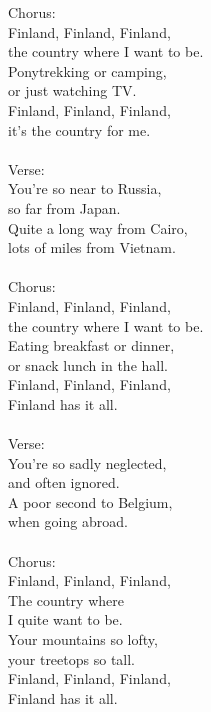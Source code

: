 
Chorus:  \\ Finland, Finland, Finland, \\ the country where I want to be. \\ Ponytrekking or camping, \\ or just watching TV. \\ Finland, Finland, Finland, \\ it's the country for me. \\ \hspace{10mm} \\ Verse:  \\ You're so near to Russia, \\ so far from Japan. \\ Quite a long way from Cairo, \\ lots of miles from Vietnam. \\ \hspace{10mm} \\ Chorus:  \\ Finland, Finland, Finland, \\ the country where I want to be. \\ Eating breakfast or dinner, \\ or snack lunch in the hall. \\ Finland, Finland, Finland, \\ Finland has it all. \\ \hspace{10mm} \\ Verse:  \\ You're so sadly neglected, \\ and often ignored. \\ A poor second to Belgium, \\ when going abroad. \\ \hspace{10mm} \\ Chorus:  \\ Finland, Finland, Finland, \\ The country where \\ I quite want to be. \\ Your mountains so lofty, \\ your treetops so tall. \\ Finland, Finland, Finland, \\ Finland has it all.